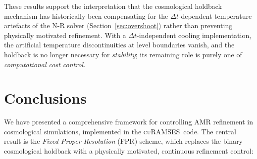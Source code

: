 \documentclass[fleqn,usenatbib]{mnras}
\newcommand{\curamses}{\textsc{cuRAMSES}}
\begin{document}
These results support the interpretation that the cosmological
holdback mechanism has historically been compensating for the
$\Delta t$-dependent temperature artefacts of the N-R solver
(Section~\ref{sec:overshoot}) rather than preventing physically
motivated refinement.  With a $\Delta t$-independent cooling
implementation, the artificial temperature discontinuities at level
boundaries vanish, and the holdback is no longer necessary for
\emph{stability}; its remaining role is purely one of
\emph{computational cost control}.


\section{Conclusions}
\label{sec:conclusions}

We have presented a comprehensive framework for controlling AMR
refinement in cosmological simulations, implemented in the \curamses\
code.  The central result is the \emph{Fixed Proper Resolution} (FPR)
scheme, which replaces the binary cosmological holdback with a
physically motivated, continuous refinement control:
\end{document}
